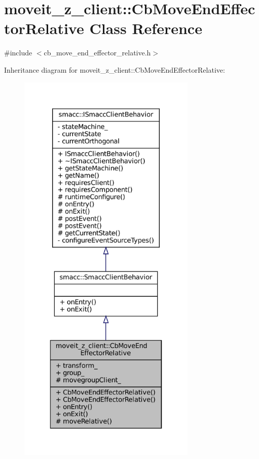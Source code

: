 \hypertarget{classmoveit__z__client_1_1CbMoveEndEffectorRelative}{}\section{moveit\+\_\+z\+\_\+client\+:\+:Cb\+Move\+End\+Effector\+Relative Class Reference}
\label{classmoveit__z__client_1_1CbMoveEndEffectorRelative}


{\ttfamily \#include $<$cb\+\_\+move\+\_\+end\+\_\+effector\+\_\+relative.\+h$>$}



Inheritance diagram for moveit\+\_\+z\+\_\+client\+:\+:Cb\+Move\+End\+Effector\+Relative\+:
\nopagebreak
\begin{figure}[H]
\begin{center}
\leavevmode
\includegraphics[height=550pt]{classmoveit__z__client_1_1CbMoveEndEffectorRelative__inherit__graph}
\end{center}
\end{figure}


